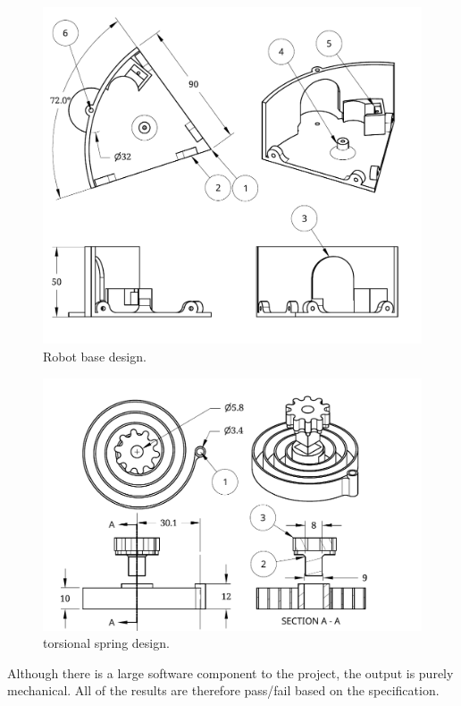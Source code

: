 \begin{figure}[H]
\centering
\includegraphics[scale = 1]{pics/DrawingBase.pdf}
\caption{Robot base design.}
\end{figure}
\begin{figure}[H]
\centering
\includegraphics[scale = 1]{pics/DrawingSpring.pdf}
\caption{torsional spring design.}
\end{figure}

Although there is a large software component to the project, the output is purely mechanical. All of the results are therefore pass/fail based on the specification.

